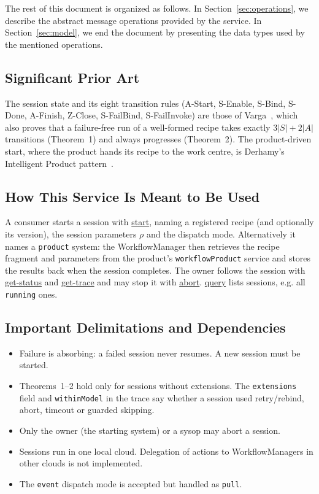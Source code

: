\documentclass[a4paper]{arrowhead}
\newcommand{\oref}[1]{{\textcolor{ArrowheadBlue}{\hyperref[sec:operations:#1]{#1}}}}
\begin{document}
The rest of this document is organized as follows.
In Section~\ref{sec:operations}, we describe the abstract message operations provided by the service.
In Section~\ref{sec:model}, we end the document by presenting the data types used by the mentioned operations.

\subsection{Significant Prior Art}
The session state and its eight transition rules (A-Start, S-Enable, S-Bind, S-Done, A-Finish, Z-Close,
S-FailBind, S-FailInvoke) are those of Varga~\cite{varga2026}, which also proves that a failure-free run of a
well-formed recipe takes exactly $3|S| + 2|A|$ transitions (Theorem~1) and always progresses (Theorem~2). The
product-driven start, where the product hands its recipe to the work centre, is Derhamy's Intelligent Product
pattern~\cite{derhamy2018workflow}.

\subsection{How This Service Is Meant to Be Used}
A consumer starts a session with \oref{start}, naming a registered recipe (and optionally its version), the
session parameters $\rho$ and the dispatch mode. Alternatively it names a \texttt{product} system: the WorkflowManager
then retrieves the recipe fragment and parameters from the product's \texttt{workflowProduct} service and stores the
results back when the session completes. The owner follows the session with \oref{get-status} and \oref{get-trace} and may
stop it with \oref{abort}. \oref{query} lists sessions, e.g. all \texttt{running} ones.

\subsection{Important Delimitations and Dependencies}
\label{sec:delimitations}
\begin{itemize}
\item Failure is absorbing: a failed session never resumes. A new session must be started.
\item Theorems~1--2 hold only for sessions without extensions. The \texttt{extensions} field and \texttt{withinModel} in the trace say whether a session used retry/rebind, abort, timeout or guarded skipping.
\item Only the owner (the starting system) or a sysop may abort a session.
\item Sessions run in one local cloud. Delegation of actions to WorkflowManagers in other clouds is not implemented.
\item The \texttt{event} dispatch mode is accepted but handled as \texttt{pull}.
\end{itemize}
\end{document}
